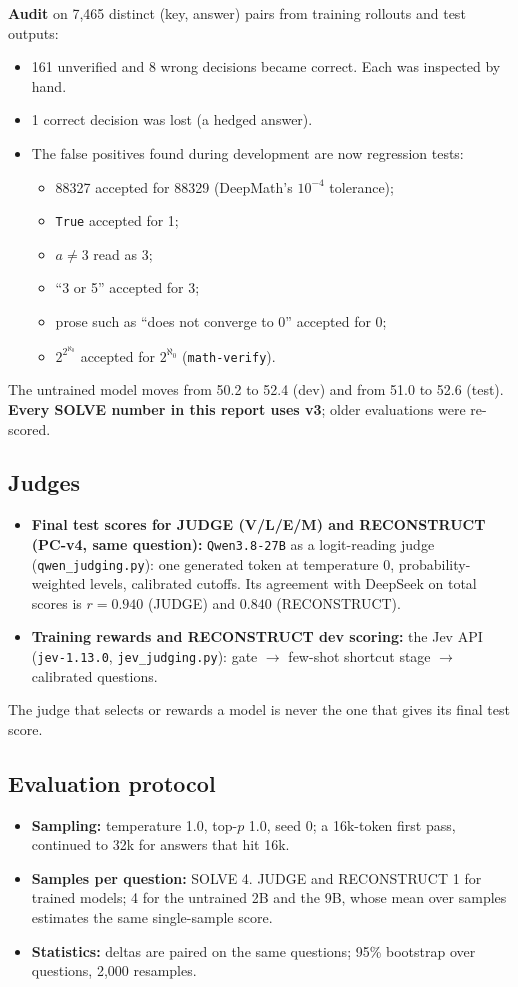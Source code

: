 \documentclass[10pt,a4paper]{article}
\begin{document}
\textbf{Audit} on 7,465 distinct (key, answer) pairs from training rollouts and test outputs:
\begin{itemize}
\item 161 unverified and 8 wrong decisions became correct. Each was inspected by hand.
\item 1 correct decision was lost (a hedged answer).
\item The false positives found during development are now regression tests:
  \begin{itemize}
  \item 88327 accepted for 88329 (DeepMath's $10^{-4}$ tolerance);
  \item \texttt{True} accepted for 1;
  \item $a\neq3$ read as 3;
  \item ``3 or 5'' accepted for 3;
  \item prose such as ``does not converge to 0'' accepted for 0;
  \item $2^{2^{\aleph_0}}$ accepted for $2^{\aleph_0}$ (\texttt{math-verify}).
  \end{itemize}
\end{itemize}
The untrained model moves from 50.2 to 52.4 (dev) and from 51.0 to 52.6 (test). \textbf{Every SOLVE number in this
report uses v3}; older evaluations were re-scored.

\subsection{Judges}
\begin{itemize}
\item \textbf{Final test scores for JUDGE (V/L/E/M) and RECONSTRUCT (PC-v4, same question):} \texttt{Qwen3.8-27B} as a
      logit-reading judge (\texttt{qwen\_judging.py}): one generated token at temperature 0, probability-weighted
      levels, calibrated cutoffs. Its agreement with DeepSeek on total scores is $r=0.940$ (JUDGE) and $0.840$
      (RECONSTRUCT).
\item \textbf{Training rewards and RECONSTRUCT dev scoring:} the Jev API (\texttt{jev-1.13.0},
      \texttt{jev\_judging.py}): gate $\rightarrow$ few-shot shortcut stage $\rightarrow$ calibrated questions.
\end{itemize}
The judge that selects or rewards a model is never the one that gives its final test score.

\subsection{Evaluation protocol}
\begin{itemize}
\item \textbf{Sampling:} temperature 1.0, top-$p$ 1.0, seed 0; a 16k-token first pass, continued to 32k for answers
      that hit 16k.
\item \textbf{Samples per question:} SOLVE 4. JUDGE and RECONSTRUCT 1 for trained models; 4 for the untrained 2B and
      the 9B, whose mean over samples estimates the same single-sample score.
\item \textbf{Statistics:} deltas are paired on the same questions; 95\% bootstrap over questions, 2,000 resamples.
\end{itemize}
\end{document}
